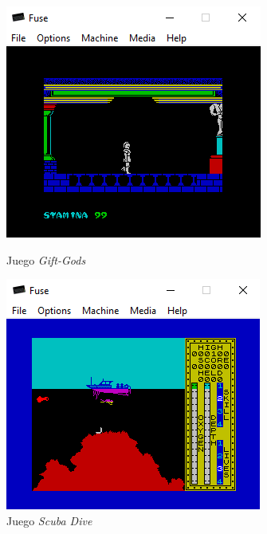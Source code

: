 \documentclass{article}
\begin{document}
\begin{figure}[!htb]
   \begin{minipage}{0.48\textwidth}
     \centering
     \includegraphics[width=.7\linewidth]{images/gift-gods.png}
     \caption{Juego \textit{Gift-Gods}}\label{Fig:giftGods}
   \end{minipage}\hfill
   \begin{minipage}{0.48\textwidth}
     \centering
     \includegraphics[width=.7\linewidth]{images/scuba.png}
     \caption{Juego \textit{Scuba Dive} }\label{Fig:scuba}
   \end{minipage}
\end{figure}
\end{document}
